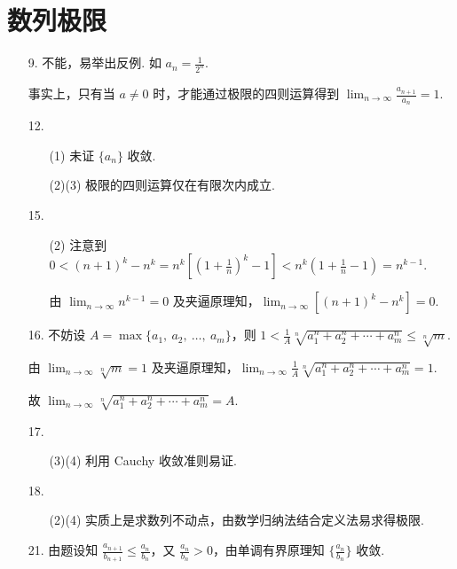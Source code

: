 \documentclass[oneside]{ctexbook} %
\begin{document}
\section{数列极限}

\begin{enumerate}
    \item[9.]
    不能，易举出反例. 如 $a_n = \frac 1 {2^n}$.
    
    事实上，只有当 $a \neq 0$ 时，才能通过极限的四则运算得到 $\displaystyle\lim_{n \to \infty} \frac{a_{n+1}}{a_n} = 1$.
    \item[12.]
    \begin{enumerate}
        \item[(1)]
        未证 $\{ a_n \}$ 收敛.
        \item[(2)(3)]
        极限的四则运算仅在有限次内成立.
    \end{enumerate}
    \item[15.]
    \begin{enumerate}
        \item[(2)]
        注意到 $0 < (n+1)^k - n^k = n^k \left[(1 + \frac 1 n)^k - 1 \right] < n^k (1 + \frac 1 n - 1) = n^{k-1}$.
        
        由 $\displaystyle \lim_{n \to \infty} n^{k-1} = 0$ 及夹逼原理知，$\displaystyle\lim_{n \to \infty} \left[(n+1)^k - n^k \right] = 0$.
    \end{enumerate}
    \item[16.]
    不妨设 $A = \max\{ a_1,\ a_2,\ \ldots,\ a_m \}$，则 $1 < \frac 1 A \sqrt[n]{a_1^n+a_2^n+\cdots+a_m^n} \leqslant \sqrt[n]{m}$.
    
    由 $\displaystyle \lim_{n \to \infty} \sqrt[n]{m} = 1$ 及夹逼原理知，$\displaystyle\lim_{n \to \infty} \frac 1 A \sqrt[n]{a_1^n+a_2^n+\cdots+a_m^n} = 1$.
    
    故 $\displaystyle \lim_{n \to \infty} \sqrt[n]{a_1^n+a_2^n+\cdots+a_m^n} = A$.
    \item[17.]
    \begin{enumerate}
        \item[(3)(4)]
        利用 Cauchy 收敛准则易证.
    \end{enumerate}
    \item[18.]
    \begin{enumerate}
        \item[(2)(4)]
        实质上是求数列不动点，由数学归纳法结合定义法易求得极限.
    \end{enumerate}
    \item[21.]
    由题设知 $\frac{a_{n+1}}{b_{n+1}} \leqslant \frac{a_n}{b_n}$，又 $\frac{a_n}{b_n} > 0$，由单调有界原理知 $\{ \frac{a_n}{b_n} \}$ 收敛.
    

\end{enumerate}
\end{document}
